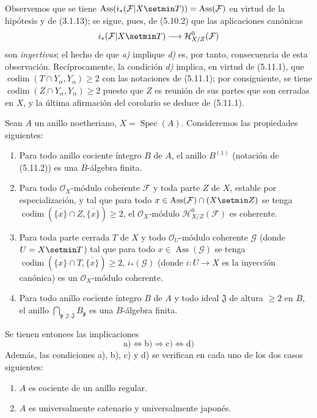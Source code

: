 Observemos que se tiene
$\operatorname{Ass}(i_*(\mathcal F\vert X\setmin T))=\operatorname{Ass}(\mathcal F)$
en virtud de la hipótesis y de (3.1.13); se sigue, pues, de (5.10.2) que las
aplicaciones canónicas
\[
i_*(\mathcal F\vert X\setmin T)\longrightarrow\mathcal H^0_{X/Z}(\mathcal F)
\]
son \emph{inyectivas}; el hecho de que \emph{a)} implique \emph{d)} es, por tanto, consecuencia de
esta observación. Recíprocamente, la condición \emph{d)} implica, en virtud de
(5.11.1), que $\operatorname{codim}(T\cap Y_\alpha,Y_\alpha)\geq2$ con las
notaciones de (5.11.1); por consiguiente, se tiene
$\operatorname{codim}(Z\cap Y_\alpha,Y_\alpha)\geq2$ puesto que $Z$ es reunión
de sus partes que son cerradas en $X$, y la última afirmación del
corolario se deduce de (5.11.1).

\begin{corollary}[5.11.6]
\label{IV.2.s5.11.6-fr}
Sean $A$ un anillo noetheriano, $X=\operatorname{Spec}(A)$. Consideremos las
propiedades siguientes:
\begin{enumerate}
\item[\textup{a)}] Para todo anillo cociente íntegro $B$ de $A$, el anillo $B^{(1)}$
\textup{(notación de (5.11.2))} es una $B$-álgebra finita.
\item[\textup{b)}] Para todo $\mathcal O_X$-módulo coherente $\mathcal F$ y toda parte
$Z$ de $X$, estable por especialización, y tal que para todo
$x\in\operatorname{Ass}(\mathcal F)\cap(X\setmin Z)$ se tenga
$\operatorname{codim}(\overline{\{x\}}\cap Z,\overline{\{x\}})\geq2$, el
$\mathcal O_X$-módulo $\mathcal H^0_{X/Z}(\mathcal F)$ es coherente.
\item[\textup{c)}] Para toda parte cerrada $T$ de $X$ y todo $\mathcal O_U$-módulo
coherente $\mathcal G$ (donde $U=X\setmin T$) tal que para todo
$x\in\operatorname{Ass}(\mathcal G)$ se tenga
$\operatorname{codim}(\overline{\{x\}}\cap T,\overline{\{x\}})\geq2$,
$i_*(\mathcal G)$ (donde $i:U\to X$ es la inyección canónica) es un
$\mathcal O_X$-módulo coherente.
\item[\textup{d)}] Para todo anillo cociente íntegro $B$ de $A$ y todo ideal
$\mathfrak J$ de altura $\geq2$ en $B$, el anillo
$\bigcap_{\mathfrak p\not\supset\mathfrak J}B_\mathfrak p$
es una $B$-álgebra finita.
\end{enumerate}
Se tienen entonces las implicaciones
\[
\mathrm a)\Longleftrightarrow\mathrm b)\Longrightarrow\mathrm c)
\Longleftrightarrow\mathrm d)
\]
Además, las condiciones \textup{a), b), c)} y \textup{d)} se verifican en cada uno de los dos
casos siguientes:
\begin{enumerate}
\item[\textup{(i)}] $A$ es cociente de un anillo regular.
\item[\textup{(ii)}] $A$ es universalmente catenario y universalmente japonés.
\end{enumerate}
\end{corollary}

